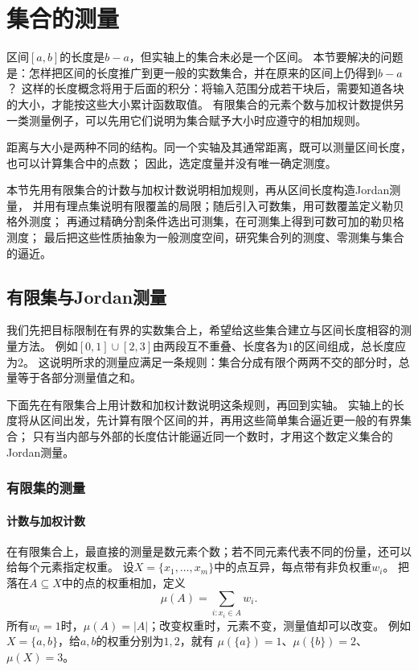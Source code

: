 \section{集合的测量}
\label{sec:comb-set-measurement}
\label{sec:analysis-set-structures}

区间$[a,b]$的长度是$b-a$，但实轴上的集合未必是一个区间。
本节要解决的问题是：怎样把区间的长度推广到更一般的实数集合，并在原来的区间上仍得到$b-a$？
这样的长度概念将用于后面的积分：将输入范围分成若干块后，需要知道各块的大小，才能按这些大小累计函数取值。
有限集合的元素个数与加权计数提供另一类测量例子，可以先用它们说明为集合赋予大小时应遵守的相加规则。

距离与大小是两种不同的结构。同一个实轴及其通常距离，既可以测量区间长度，也可以计算集合中的点数；
因此，选定度量并没有唯一确定测度。

本节先用有限集合的计数与加权计数说明相加规则，再从区间长度构造Jordan测量，
并用有理点集说明有限覆盖的局限；随后引入可数集，用可数覆盖定义勒贝格外测度；
再通过精确分割条件选出可测集，在可测集上得到可数可加的勒贝格测度；
最后把这些性质抽象为一般测度空间，研究集合列的测度、零测集与集合的逼近。

\subsection{有限集与Jordan测量}
\label{sec:comb-counting-to-weight}

我们先把目标限制在有界的实数集合上，希望给这些集合建立与区间长度相容的测量方法。
例如$[0,1]\cup[2,3]$由两段互不重叠、长度各为$1$的区间组成，总长度应为$2$。
这说明所求的测量应满足一条规则：集合分成有限个两两不交的部分时，总量等于各部分测量值之和。

下面先在有限集合上用计数和加权计数说明这条规则，再回到实轴。
实轴上的长度将从区间出发，先计算有限个区间的并，再用这些简单集合逼近更一般的有界集合；
只有当内部与外部的长度估计能逼近同一个数时，才用这个数定义集合的Jordan测量。

\subsubsection{有限集的测量}

\paragraph{计数与加权计数}

在有限集合上，最直接的测量是数元素个数；若不同元素代表不同的份量，还可以给每个元素指定权重。
设$X=\{x_1,\ldots,x_m\}$中的点互异，每点带有非负权重$w_i$。
把落在$A\subseteq X$中的点的权重相加，定义
\[
 \mu(A)=\sum_{i:x_i\in A}w_i.
\]
所有$w_i=1$时，$\mu(A)=|A|$；改变权重时，元素不变，测量值却可以改变。
例如$X=\{a,b\}$，给$a,b$的权重分别为$1,2$，就有
$\mu(\{a\})=1$、$\mu(\{b\})=2$、$\mu(X)=3$。

